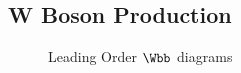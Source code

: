 \subsection{W Boson Production}
\begin{figure}[hb]
\centering
  \begin{subfigure}[b]{.35\textwidth}
	\end{subfigure}	
   \begin{subfigure}[b]{.35\textwidth}
    \end{subfigure}	
  	\caption[Leading Order $\Wbb$ diagrams]
   	{Leading Order $\Wbb$ diagrams}

	\label{fig:WbbLO}
\end{figure}

